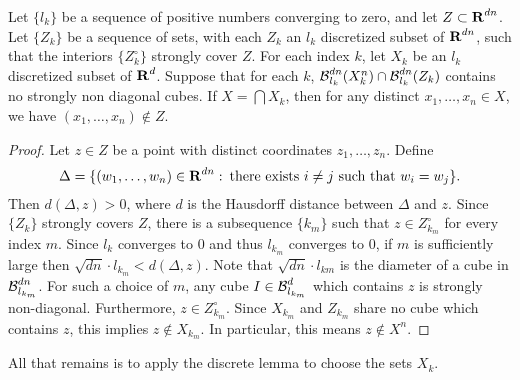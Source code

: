 \begin{lemma} \label{stronglydiagonal}
	Let $\{ l_k \}$ be a sequence of positive numbers converging to zero, and let $Z \subset \operatorname{\mathbf{R}}^{dn}$. Let $\{ Z_k \}$ be a sequence of sets, with each $Z_k$ an $l_k$ discretized subset of $\operatorname{\mathbf{R}}^{dn}$, such that the interiors $\{ Z_k^\circ \}$ strongly cover $Z$. For each index $k$, let $X_k$ be an $l_k$ discretized subset of $\operatorname{\mathbf{R}}^d$. Suppose that for each $k$, $\operatorname{\mathcal{B}}^{dn}_{l_k}(X_k^n) \cap \operatorname{\mathcal{B}}^{dn}_{l_k}(Z_k)$ contains no strongly non diagonal cubes. If $X = \bigcap X_k$, then for any distinct $x_1, \dots, x_n \in X$, we have $(x_1, \dots, x_n) \not \in Z$.
\end{lemma}
\begin{proof}
	Let $z \in Z$ be a point with distinct coordinates $z_1, \dots, z_n$. Define
	\[ \Delta = \{ (w_1, \dots, w_n) \in \operatorname{\mathbf{R}}^{dn} \operatorname{\colon} \text{there exists $i \neq j$ such that $w_i = w_j$} \}. \]
	Then $d(\Delta,z) > 0$, where $d$ is the Hausdorff distance between $\Delta$ and $z$. Since $\{ Z_k \}$ strongly covers $Z$, there is a subsequence $\{ k_m \}$ such that $z \in Z_{k_m}^\circ$ for every index $m$. Since $l_k$ converges to 0 and thus $l_{k_m}$ converges to $0$, if $m$ is sufficiently large then $\sqrt{dn} \cdot l_{k_m} < d(\Delta,z)$. Note that $\sqrt{dn} \cdot l_{km}$ is the diameter of a cube in $\operatorname{\mathcal{B}}_{l_{k_m}}^{dn}$. For such a choice of $m$, any cube $I \in \operatorname{\mathcal{B}}^d_{l_{k_m}}$ which contains $z$ is strongly non-diagonal. Furthermore, $z \in Z_{k_m}^\circ$. Since $X_{k_m}$ and $Z_{k_m}$ share no cube which contains $z$, this implies $z \not \in X_{k_m}$. In particular, this means $z \not\in X^n$.
\end{proof}

All that remains is to apply the discrete lemma to choose the sets $X_k$.

